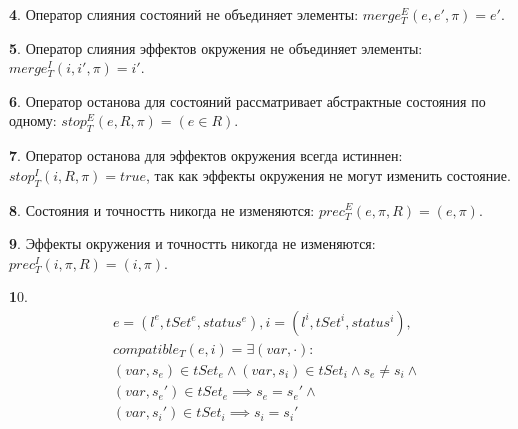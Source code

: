 

{\textbf 4.} Оператор слияния состояний не объединяет элементы: $merge^E_T(e, e', \pi) = e'$.

{\textbf 5.} Оператор слияния эффектов окружения не объединяет элементы: $merge^I_T(i, i', \pi) = i'$.

{\textbf 6.} Оператор останова для состояний рассматривает абстрактные состояния по одному: $stop^E_T(e, R, \pi) = (e \in R)$.

{\textbf 7.} Оператор останова для эффектов окружения всегда истиннен: $stop^I_T(i, R, \pi) = true$, так как эффекты окружения не могут изменить состояние.

{\textbf 8.} Состояния и точностть никогда не изменяются: $prec^E_T(e, \pi, R) = (e, \pi)$.

{\textbf 9.} Эффекты окружения и точностть никогда не изменяются: $prec^I_T(i, \pi, R) = (i, \pi)$.

{\textbf 10.} 
\begin{equation}
\label{compatible_thread}
\begin{aligned}
& e = (l^e, tSet^e, status^e), i = (l^i, tSet^i, status^i), \\
& compatible_T(e,i) = \exists (var, \cdot): \\
& (var, s_e) \in tSet_e \land  (var, s_i) \in tSet_i \land s_e \neq s_i \land \\
& (var, s_e') \in tSet_e \implies s_e = s_e' \land \\
& (var, s_i') \in tSet_i \implies s_i = s_i'
\end{aligned}
\end{equation}


